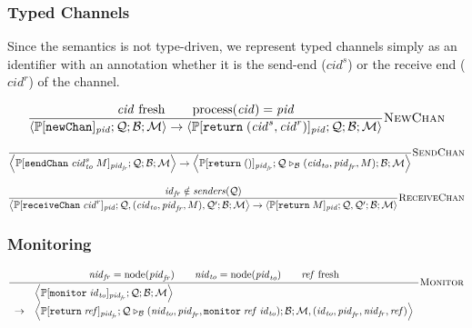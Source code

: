 \documentclass{article}
\newcommand{\sReturn}{\mathtt{return}}
\newcommand{\sNewChan}{\mathtt{newChan}}
\newcommand{\sSendChan}{\mathtt{sendChan}}
\newcommand{\sReceiveChan}{\mathtt{receiveChan}}
\newcommand{\sMonitor}{\mathtt{monitor}}
\DeclareMathOperator{\sNodeOf}{node}
\DeclareMathOperator{\sProcessOf}{process}
\newcommand{\sExtend}[1]{\mathrel{\triangleright_{#1}}}
\newcommand{\sNid}{\ensuremath{\mathit{nid}}}
\newcommand{\sPid}{\ensuremath{\mathit{pid}}}
\newcommand{\sCid}{\ensuremath{\mathit{cid}}}
\newcommand{\sId}{\ensuremath{\mathit{id}}}
\newcommand{\sRef}{\ensuremath{\mathit{ref}}}
\newcommand{\sSystem}[4]{\left\langle #1 ; #2 ; #3 ; #4 \right\rangle}
\newcommand{\sQueue}{\mathcal{Q}}
\newcommand{\sBlacklist}{\mathcal{B}}
\newcommand{\sMonitors}{\mathcal{M}}
\newcommand{\sCtxt}[1]{\mathbb{#1}}
\newcommand{\sSenders}{\mathit{senders}}
\begin{document}
\subsubsection{Typed Channels}

Since the semantics is not type-driven, we represent typed channels simply as
an identifier with an annotation whether it is the send-end ($\sCid^s$) or the
receive end ($\sCid^r$) of the channel.

\begin{equation*}
\frac{
  \sCid \text{ fresh}
\qquad
  \sProcessOf(\sCid) = \sPid
}{
  \sSystem{\sCtxt{P}[\sNewChan]_\sPid}
          {\sQueue}
          {\sBlacklist}
          {\sMonitors}
\rightarrow
  \sSystem{\sCtxt{P}[\sReturn \; (\sCid^s, \sCid^r)]_\sPid}
          {\sQueue}
          {\sBlacklist}
          {\sMonitors}
} \textsc{NewChan}
\end{equation*}

\begin{equation*}
\frac{
}{
  \sSystem{\sCtxt{P}[ \sSendChan \; \sCid_\mathit{to}^s \; M ]_{\sPid_\mathit{fr}}}
          {\sQueue}
          {\sBlacklist}
          {\sMonitors}
\rightarrow 
  \sSystem{\sCtxt{P}[ \sReturn \; () ]_{\sPid_\mathit{fr}}}
          {\sQueue \sExtend{\sBlacklist} (\sCid_\mathit{to}, \sPid_\mathit{fr}, M)}
          {\sBlacklist}
          {\sMonitors}
} \textsc{SendChan}
\end{equation*}

\begin{equation*}
\frac{
  \sId_{\mathit{fr}} \notin \sSenders(\sQueue)
}{
  \sSystem{\sCtxt{P}[ \sReceiveChan \; \sCid^r ]_{\sPid}}
          {\sQueue, (\sCid_\mathit{to}, \sPid_\mathit{fr}, M), \sQueue'}
          {\sBlacklist}
          {\sMonitors}
\rightarrow
  \sSystem{\sCtxt{P}[ \sReturn \; M ]_{\sPid}}
          {\sQueue, \sQueue'}
          {\sBlacklist}
          {\sMonitors}
} \textsc{ReceiveChan}
\end{equation*}

\subsubsection{Monitoring}

\begin{equation*}
\frac{
  \sNid_\mathit{fr} = \sNodeOf(\sPid_\mathit{fr}) 
\qquad
  \sNid_\mathit{to} = \sNodeOf(\sPid_\mathit{to})
\qquad
  \sRef \text{ fresh}
}{
\begin{array}{ll}
& \sSystem{\sCtxt{P}[ \sMonitor \; \sId_\mathit{to} ]_{\sPid_\mathit{fr}}}
          {\sQueue}
          {\sBlacklist}
          {\sMonitors}
\\         
\rightarrow &
  \sSystem{\sCtxt{P}[ \sReturn \; \sRef ]_{\sPid_\mathit{fr}}}
          {\sQueue \sExtend{\sBlacklist} (\sNid_\mathit{to}, \sPid_\mathit{fr}, \sMonitor \; \sRef \; \sId_\mathit{to})}
          {\sBlacklist}
          {\sMonitors, (\sId_\mathit{to}, \sPid_\mathit{fr}, \sNid_\mathit{fr}, \sRef)}
\end{array}
} \textsc{Monitor}
\end{equation*}
\end{document}
